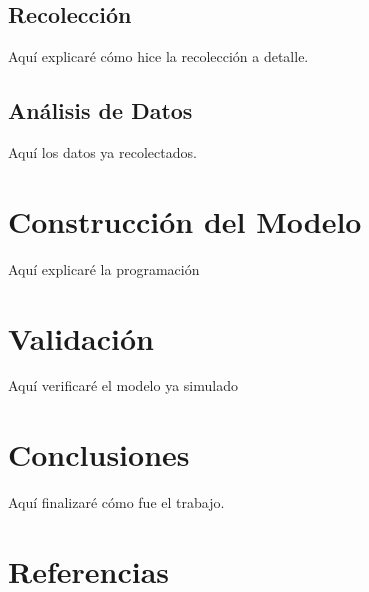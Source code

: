 \documentclass{article}
\begin{document}
 \subsection{Recolección}
 	Aquí explicaré cómo hice la recolección a detalle. 
 \subsection{Análisis de Datos}	
	Aquí los datos ya recolectados.
	
\section{Construcción del Modelo}
	Aquí explicaré la programación
\section{Validación}
	Aquí verificaré el modelo ya simulado
\section{Conclusiones}
	Aquí finalizaré cómo fue el trabajo.
	
\section{Referencias}

\printbibliography
\end{document}
